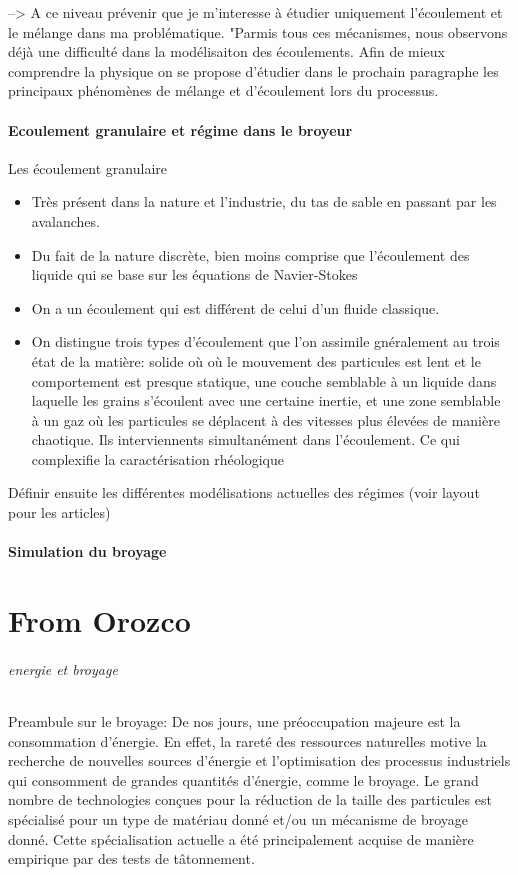 --> A ce niveau prévenir que je m'interesse à étudier uniquement l'écoulement et le mélange dans ma problématique.
"Parmis tous ces mécanismes, nous observons déjà une difficulté dans la modélisaiton des écoulements. Afin de mieux comprendre la physique on se propose d'étudier dans le prochain paragraphe les principaux phénomènes de mélange et d'écoulement lors du processus.

\subsection{Ecoulement granulaire et régime dans le broyeur}
Les écoulement granulaire

\begin{itemize}
    \item Très présent dans la nature et l'industrie, du tas de sable en passant par les avalanches.
    \item Du fait de la nature discrète, bien moins comprise que l'écoulement des liquide qui se base sur les équations de Navier-Stokes
    \item On a un écoulement qui est différent de celui d'un fluide classique.
    \item On distingue trois types d'écoulement que l'on assimile gnéralement au trois état de la matière: solide où où le mouvement des particules est lent et le comportement est presque statique, une couche semblable à un liquide dans laquelle les grains s'écoulent avec une certaine inertie, et une zone semblable à un gaz où les particules se déplacent à des vitesses plus élevées de manière chaotique. Ils interviennents simultanément dans l'écoulement. Ce qui complexifie la caractérisation rhéologique
\end{itemize}

Définir ensuite les différentes modélisations actuelles des régimes (voir layout pour les articles)

\subsection{Simulation du broyage}

\part{From Orozco}
\paragraph{energie et broyage}
Preambule sur le broyage: De nos jours, une préoccupation majeure est la consommation d'énergie. En effet, la rareté des ressources naturelles motive la recherche de nouvelles sources d'énergie et l'optimisation des processus industriels qui consomment de grandes quantités d'énergie, comme le broyage. Le grand nombre de technologies conçues pour la réduction de la taille des particules est spécialisé pour un type de matériau donné et/ou un mécanisme de broyage donné. Cette spécialisation actuelle a été principalement acquise de manière empirique par des tests de tâtonnement.


